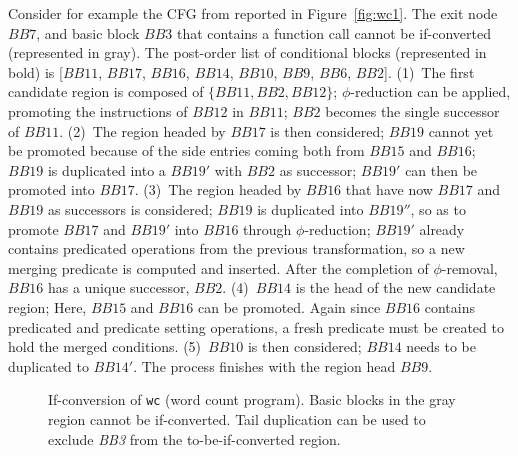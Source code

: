Consider for example the CFG from reported in Figure~\ref{fig:wc1}. 
The exit node $\textit{BB}7$, and basic block $\textit{BB}3$ that contains a function call cannot be if-converted (represented in gray). 
The post-order list of conditional blocks (represented in bold) is [$\textit{BB}11$, $\textit{BB}17$, $\textit{BB}16$, $\textit{BB}14$, $\textit{BB}10$, $\textit{BB}9$, $\textit{BB}6$, $\textit{BB}2$]. 
(1)~The first candidate region is composed of $\{\textit{BB11}, \textit{BB}2, \textit{BB}12\}$; 
$\phi$-reduction can be applied, promoting the instructions of $\textit{BB}12$ in $\textit{BB}11$; 
$\textit{BB}2$ becomes the single successor of $\textit{BB}11$. 
(2)~The region headed by $\textit{BB}17$ is then considered; 
$\textit{BB}19$ cannot yet be promoted because of the side entries coming both from $\textit{BB}15$ and $\textit{BB}16$; 
$\textit{BB}19$ is duplicated into a $\textit{BB}19'$ with $\textit{BB}2$ as successor; 
$\textit{BB}19'$ can then be promoted into $\textit{BB}17$. 
(3)~The region headed by $\textit{BB}16$ that have now $\textit{BB}17$ and $\textit{BB}19$ as successors is considered; 
$\textit{BB}19$ is duplicated into $\textit{BB}19''$, so as to promote $\textit{BB}17$ and $\textit{BB}19'$ into $\textit{BB}16$ through $\phi$-reduction; 
$\textit{BB}19'$ already contains predicated operations from the previous transformation, so a new merging predicate is computed and inserted.
After the completion of $\phi$-removal, $\textit{BB}16$ has a unique successor, $\textit{BB}2$. 
(4)~$\textit{BB}14$ is the head of the new candidate region;
Here, $\textit{BB}15$ and $\textit{BB}16$ can be promoted.
Again since $\textit{BB}16$ contains predicated and predicate setting operations, a fresh predicate must be created to hold the merged conditions. 
(5)~$\textit{BB}10$ is then considered; 
$\textit{BB}14$ needs to be duplicated to $\textit{BB}14'$. 
The process finishes with the region head $\textit{BB}9$.

\begin{figure}
\caption{\label{fig:wc example}If-conversion of \texttt{wc} (word count program). Basic blocks in the gray region cannot be if-converted. Tail duplication can be used to exclude \textit{BB3} from the to-be-if-converted region.}
\end{figure}


